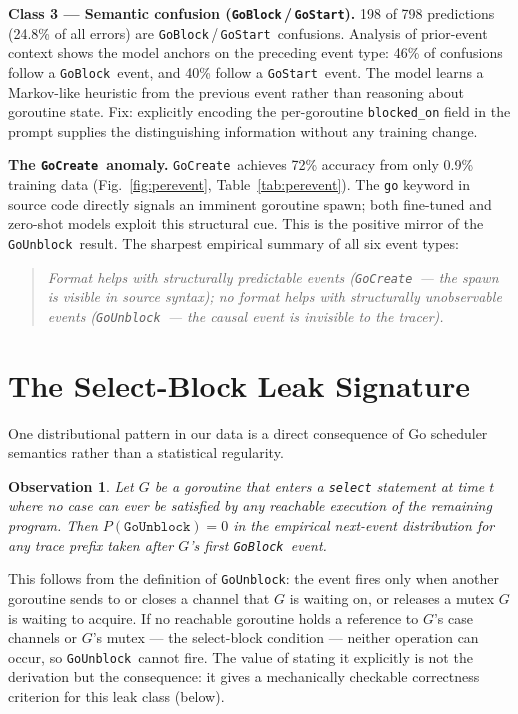 \documentclass[10pt,conference]{IEEEtran}
\newcommand{\eblock}{\texttt{GoBlock}}
\newcommand{\eunblock}{\texttt{GoUnblock}}
\newcommand{\estart}{\texttt{GoStart}}
\newcommand{\ecreate}{\texttt{GoCreate}}
\newtheorem{observation}{Observation}
\begin{document}
\textbf{Class 3 — Semantic confusion (\eblock\,/\,\estart).}
198 of 798 predictions (24.8\% of all errors) are \eblock\,/\,\estart\
confusions.
Analysis of prior-event context shows the model anchors on the
preceding event type: 46\% of confusions follow a \eblock\ event, and
40\% follow a \estart\ event.
The model learns a Markov-like heuristic from the previous event rather
than reasoning about goroutine state.
Fix: explicitly encoding the per-goroutine \texttt{blocked\_on} field
in the prompt supplies the distinguishing information without any
training change.

\textbf{The \ecreate\ anomaly.}
\ecreate\ achieves 72\% accuracy from only 0.9\% training data
(Fig.~\ref{fig:perevent}, Table~\ref{tab:perevent}).
The \texttt{go} keyword in source code directly signals an imminent
goroutine spawn; both fine-tuned and zero-shot models exploit this
structural cue.
This is the positive mirror of the \eunblock\ result.
The sharpest empirical summary of all six event types:
\begin{quote}
\textit{Format helps with structurally predictable events (\ecreate\
— the spawn is visible in source syntax); no format helps with
structurally unobservable events (\eunblock\ — the causal event is
invisible to the tracer).}
\end{quote}

\section{The Select-Block Leak Signature}\label{sec:signature}

One distributional pattern in our data is a direct consequence of Go
scheduler semantics rather than a statistical regularity.

\begin{observation}\label{prop:select}
Let $G$ be a goroutine that enters a \texttt{select} statement at time
$t$ where no case can ever be satisfied by any reachable execution of
the remaining program.
Then $P(\eunblock){=}0$ in the empirical next-event distribution for
any trace prefix taken after $G$'s first \eblock\ event.
\end{observation}

This follows from the definition of \eunblock: the event fires only
when another goroutine sends to or closes a channel that $G$ is waiting
on, or releases a mutex $G$ is waiting to acquire.
If no reachable goroutine holds a reference to $G$'s case channels or
$G$'s mutex — the select-block condition — neither operation can occur,
so \eunblock\ cannot fire.
The value of stating it explicitly is not the derivation but the
consequence: it gives a mechanically checkable correctness criterion
for this leak class (below).
\end{document}
